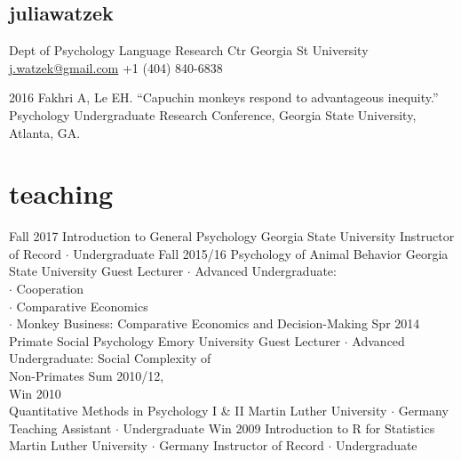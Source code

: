 \documentclass[]{friggeri-cv}
\begin{document}

\newpage
\thispagestyle{fancy}

\begin{aside}
  \section{{\normalfont julia}watzek}
    Dept of Psychology
    Language Research Ctr
    Georgia St University
    ~
    \href{mailto:j.watzek@gmail.com}{j.watzek@gmail.com}
    +1 (404) 840-6838
\end{aside}


\begin{entrylist2}
  \entrytwo
    {2016}
    {Fakhri A, Le EH. ``Capuchin monkeys respond to advantageous inequity.'' Psychology Undergraduate Research Conference, Georgia State University, Atlanta, GA.}
\end{entrylist2}



\section{teaching}

\begin{entrylist}
  \entry
    {Fall 2017}
    {Introduction to General Psychology}
    {Georgia State University}
    {Instructor of Record $\cdot$ Undergraduate}
  \entry
    {Fall 2015/16}
    {Psychology of Animal Behavior}
    {Georgia State University}
    {Guest Lecturer $\cdot$ Advanced Undergraduate:\\ 
    $\cdot$ Cooperation\\
    $\cdot$ Comparative Economics\\
    $\cdot$ Monkey Business: Comparative Economics and Decision-Making}
  \entry
    {Spr 2014}
    {Primate Social Psychology}
    {Emory University}
    {Guest Lecturer $\cdot$ Advanced Undergraduate: Social Complexity of\\ Non-Primates}
  \entry
    {Sum 2010/12,\\Win 2010\\[-.85cm]}
    {Quantitative Methods in Psychology I \& II}
    {Martin Luther University $\cdot$ Germany}
    {Teaching Assistant $\cdot$ Undergraduate}
  \entry
    {Win 2009}
    {Introduction to R for Statistics}
    {Martin Luther University $\cdot$ Germany}
    {Instructor of Record $\cdot$ Undergraduate}
\end{entrylist}
\end{document}
